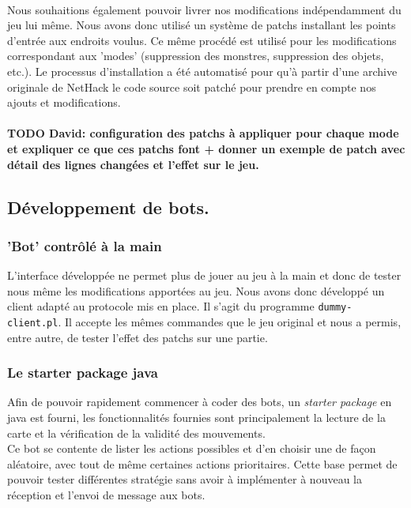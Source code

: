 \documentclass[a4paper,12pt]{article}
\begin{document}
\paragraph{} Nous souhaitions également pouvoir livrer nos modifications
indépendamment du jeu lui même. Nous avons donc utilisé un système de patchs
installant les points d'entrée aux endroits voulus. Ce même procédé est
utilisé pour les modifications correspondant aux 'modes' (suppression des
monstres, suppression des objets, etc.). Le processus d'installation a été
automatisé pour qu'à partir d'une archive originale de NetHack le code source
soit patché pour prendre en compte nos ajouts et modifications.

\paragraph{} 
\textbf{TODO David: configuration des patchs à appliquer pour chaque mode et
	expliquer ce que ces patchs font + donner un exemple de patch avec détail
	des lignes changées et l'effet sur le jeu.}

\subsection{Développement de bots.}

\subsubsection{'Bot' contrôlé à la main}

L'interface développée ne permet plus de jouer au jeu à la main et donc de
tester nous même les modifications apportées au jeu. Nous avons donc développé
un client adapté au protocole mis en place. Il s'agit du programme
\verb!dummy-client.pl!. Il accepte les mêmes commandes que le jeu original et
nous a permis, entre autre, de tester l'effet des patchs sur une partie.


\subsubsection{Le starter package java}
Afin de pouvoir rapidement commencer à coder des bots, un \emph{starter package}
en java est fourni, les fonctionnalités fournies sont principalement la lecture
de la carte et la vérification de la validité des mouvements.
\\
Ce bot se contente de lister les actions possibles et d'en choisir une de façon
aléatoire, avec tout de même certaines actions prioritaires. Cette base permet
de pouvoir tester différentes stratégie sans avoir à implémenter à nouveau la
réception et l'envoi de message aux bots.
\end{document}
